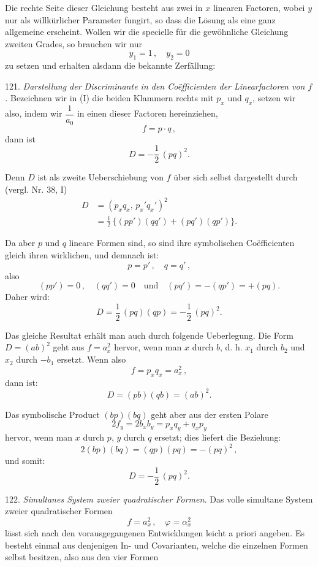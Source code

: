 Die rechte Seite dieser Gleichung besteht aus zwei in $x$ linearen Factoren, wobei $y$ nur als willkürlicher Parameter fungirt, so dass die Lösung als eine ganz allgemeine erscheint. Wollen wir die specielle für die gewöhnliche Gleichung zweiten Grades, so brauchen wir nur
\[
y_1 = 1\,, \quad y_2 = 0
\]
zu setzen und erhalten alsdann die bekannte Zerfällung:


121. \textit{Darstellung der Discriminante in den Co\"efficienten der Linearfactoren von $f$.} Bezeichnen wir in (I) die beiden Klammern rechts mit $p_x$ und $q_x$, setzen wir also, indem wir $\dfrac{1}{a_0}$ in einen dieser Factoren hereinziehen,
\[
f = p\cdot q\,,
\]
dann ist
\[
D = -\frac{1}{2}\,(pq)^2.
\]

Denn $D$ ist als zweite Ueberschiebung von $f$ über sich selbst dargestellt durch (vergl. Nr. 38, I)
\[
\begin{aligned}
D &= (p_x q_x,\, p_x' q_x')^2 \\
&= \frac{1}{2}\,\{(pp')(qq') + (pq')(qp')\}.
\end{aligned}
\]

Da aber $p$ und $q$ lineare Formen sind, so sind ihre symbolischen Co\"efficienten gleich ihren wirklichen, und demnach ist:
\[
p = p'\,, \quad q = q'\,,
\]
also
\[
(pp') = 0\,, \quad (qq') = 0 \quad \text{und} \quad (pq') = -(qp') = +(pq).
\]
Daher wird:
\[
D = \frac{1}{2}\,(pq)(qp) = -\frac{1}{2}\,(pq)^2.
\]

Das gleiche Resultat erhält man auch durch folgende Ueberlegung. Die Form $D=(ab)^2$ geht aus $f=a_x^2$ hervor, wenn man $x$ durch $b$, d. h. $x_1$ durch $b_2$ und $x_2$ durch $-b_1$ ersetzt. Wenn also
\[
f = p_x q_x = a_x^2\,,
\]
dann ist:
\[
D = (pb)(qb) = (ab)^2.
\]

Das symbolische Product $(bp)(bq)$ geht aber aus der ersten Polare
\[
2f_y = 2b_x b_y = p_x q_y + q_x p_y
\]
hervor, wenn man $x$ durch $p$, $y$ durch $q$ ersetzt; dies liefert die Beziehung:
\[
2(bp)(bq) = (qp)(pq) = -(pq)^2\,,
\]
und somit:
\[
D = -\frac{1}{2}\,(pq)^2.
\]

122. \textit{Simultanes System zweier quadratischer Formen.} Das volle simultane System zweier quadratischer Formen
\[
f = a_x^2\,, \quad \varphi = \alpha_x^2
\]
lässt sich nach den vorausgegangenen Entwicklungen leicht a priori angeben. Es besteht einmal aus denjenigen In- und Covarianten, welche die einzelnen Formen selbst besitzen, also aus den vier Formen



